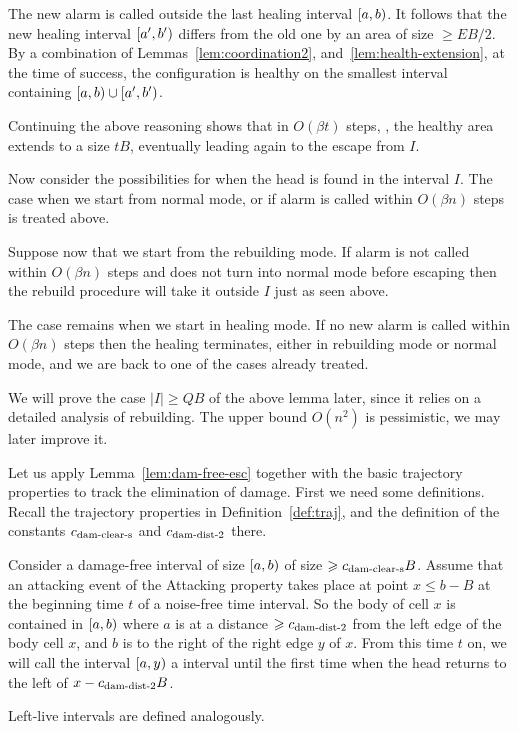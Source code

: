 \documentclass[12pt]{memoir}
\newcommand{\authnote}[3]
{\text{{ \textcolor{#3}{\( \langle\hspace{-0.2em}\langle \)\textsf{\footnotesize #1: #2}\( \rangle\hspace{-0.2em}\rangle \)}}}}
\newcommand{\authnote}[2]{}
\newcommand{\Pnote}[1]{{\authnote{Peter}{#1}{cyan}}}
\renewcommand{\le}{\leq}
\def\B{B}
\newcommand{\E}{E}
\newcommand{\cns}[1]{c_{\textrm{\upshape #1}}}
\newcommand{\cDamClearS}{\cns{dam-clear-s}}
\newcommand{\cDamDist}[1]{\cns{dam-dist-#1}}
\begin{document}
\begin{Proof}
\begin{pproof}
The new alarm is called outside the last healing interval \( [a,b) \).
It follows that the new healing interval \( [a',b') \) differs from the old one
by an area of size \( \ge \E\B/2 \).
By a combination of Lemmas~\ref{lem:coordination2}, and~\ref{lem:health-extension}, 
at the time of success, the configuration is healthy on the smallest interval
containing \( [a,b)\cup[a',b') \).

Continuing the above reasoning shows that in \( O(\beta t)  \) steps,
\Pnote{Estimate!}, the healthy area extends to a size \( t\B \), eventually 
leading again to the escape from \( I \).
\end{pproof} %

Now consider the possibilities for when the head is found in the interval \( I \).
The case when we start from normal mode, or if alarm is called within \( O(\beta n) \) 
steps is treated above.

Suppose now that we start from the rebuilding mode.
If alarm is not called within \( O(\beta n) \) steps and does not turn into normal mode
before escaping then the rebuild procedure will take it outside \( I \) just as seen above.

The case remains when we start in healing mode.
If no new alarm is called within \( O(\beta n) \) steps then the healing terminates,
either in rebuilding mode or normal mode, and we are back to one of the cases
already treated.
\end{Proof}

We will prove the case \( |I|\ge Q\B \) of the above
lemma later, since it relies on a detailed analysis of rebuilding.
The upper bound \( O(n^{2}) \) is pessimistic, we may later improve it.

Let us apply Lemma~\ref{lem:dam-free-esc} together with
the basic trajectory properties to track the elimination of damage.
First we need some definitions.
Recall the trajectory properties in Definition~\ref{def:traj}, and the 
definition of the constants \( \cDamClearS  \) and \( \cDamDist2  \)
there.

\begin{definition}\label{def:right-live}
Consider a damage-free interval of size \( [a,b) \) of size
\( \ge \cDamClearS \B \).
Assume that an attacking event of the Attacking property takes place at point \( x\le b-\B \)
at the beginning time \( t \) of a noise-free time interval.
So the body of cell \( x \) is contained in \([a,b) \)
where  \( a \) is at a distance \( \ge\cDamDist2  \) from the left edge of
the body cell \( x \), and \( b \) is to the right of the right edge \( y \) of \( x \).
From this time \( t \) on, we will call the interval \( [a,y) \) a
 interval until the first time when the head returns
to the left of \( x-\cDamDist2 \B \).

Left-live intervals are defined analogously.
\end{definition}
\end{document}
